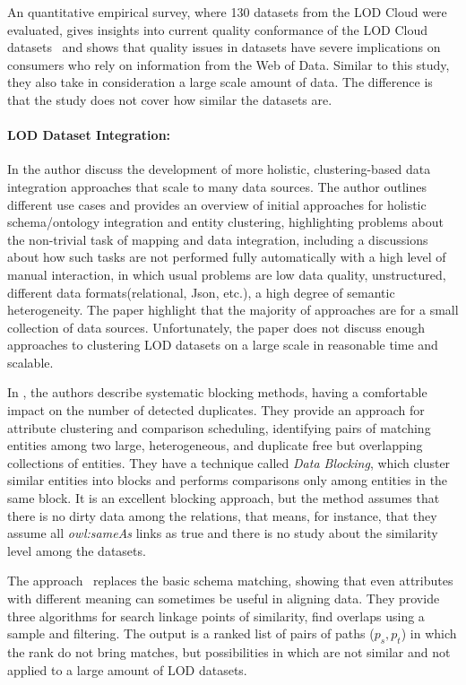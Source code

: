 \documentclass[sw]{iosart2x}
\begin{document}
An quantitative empirical survey, where 130 datasets from the LOD Cloud were evaluated, gives insights into current quality conformance of the LOD Cloud datasets~\cite{debattista2018evaluating} and shows that quality issues in datasets have severe implications on consumers who rely on information from the Web
of Data.
Similar to this study, they also take in consideration a large scale amount of data.
The difference is that the study does not cover how similar the datasets are.

\paragraph*{\textbf{LOD Dataset Integration:}}
In \cite{rahm2016case} the author discuss the development of more holistic, clustering-based data integration approaches that scale to many data sources.
The author outlines different use cases and provides an overview of initial approaches for holistic schema/ontology integration and entity clustering, highlighting problems about the non-trivial task of mapping and data integration, including a discussions about how such tasks are not performed fully automatically with a high level of manual interaction, in which usual problems are low data quality, unstructured, different data formats(relational, Json, etc.), a high degree of semantic heterogeneity.
The paper highlight that the majority of approaches are for a small collection of data sources.
Unfortunately, the paper does not discuss enough approaches to clustering LOD datasets on a large scale in reasonable time and scalable.

In \cite{papadakis2012blocking}, the authors describe systematic blocking methods, having a comfortable impact on the number of detected duplicates.
They provide an approach for attribute clustering and comparison scheduling, identifying pairs of matching entities among two large, heterogeneous, and duplicate free but overlapping collections of entities.
They have a technique called \textit{Data Blocking}, which cluster similar entities into blocks and performs comparisons only among entities in the same block.
It is an excellent blocking approach, but the method assumes that there is no dirty data among the relations, that means, for instance, that they assume all \textit{owl:sameAs} links as true and there is no study about the similarity level among the datasets.
 
The approach~\cite{hassanzadeh2013discovering} replaces the basic schema matching, showing that even attributes with different meaning can sometimes be useful in aligning data.
They provide three algorithms for search linkage points of similarity, find overlaps using a sample and filtering.
The output is a ranked list of pairs of paths ($p_s, p_t$) in which the rank do not bring matches, but possibilities in which are not similar and not applied to a large amount of LOD datasets.
\end{document}
